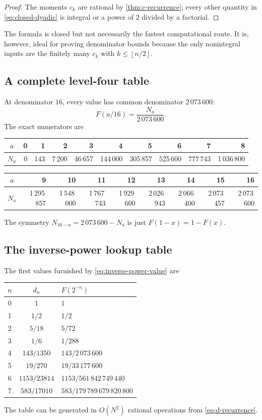 \documentclass[11pt,oneside]{article}
\theoremstyle{definition}
\theoremstyle{remark}
\newcommand{\floor}[1]{\left\lfloor#1\right\rfloor}
\begin{document}
\begin{proof}
The moments $c_k$ are rational by \cref{thm:c-recurrence}; every other quantity
in \eqref{eq:closed-dyadic} is integral or a power of $2$ divided by a factorial.
\end{proof}

The formula is closed but not necessarily the fastest computational route.  It is,
however, ideal for proving denominator bounds because the only nonintegral inputs
are the finitely many $c_k$ with $k\le\floor{n/2}$.

\subsection{A complete level-four table}

At denominator $16$, every value has common denominator $2\,073\,600$:
\begin{equation}\label{eq:level-four-common-den}
  F(a/16)=\frac{N_a}{2\,073\,600}.
\end{equation}
The exact numerators are
\begin{center}
\small
\begin{tabular}{c|rrrrrrrrr}
\toprule
$a$&0&1&2&3&4&5&6&7&8\\
\midrule
$N_a$&0&143&7\,200&46\,657&144\,000&305\,857&525\,600&777\,743&1\,036\,800\\
\bottomrule
\end{tabular}

\vspace{0.7em}
\begin{tabular}{c|rrrrrrrr}
\toprule
$a$&9&10&11&12&13&14&15&16\\
\midrule
$N_a$&1\,295\,857&1\,548\,000&1\,767\,743&1\,929\,600&2\,026\,943&2\,066\,400&2\,073\,457&2\,073\,600\\
\bottomrule
\end{tabular}
\end{center}
The symmetry $N_{16-a}=2\,073\,600-N_a$ is just
$F(1-x)=1-F(x)$.

\subsection{The inverse-power lookup table}

The first values furnished by \eqref{eq:inverse-power-value} are
\begin{center}
\begin{tabular}{ccl}
\toprule
$n$&$d_n$&$F(2^{-n})$\\
\midrule
0&$1$&$1$\\
1&$1/2$&$1/2$\\
2&$5/18$&$5/72$\\
3&$1/6$&$1/288$\\
4&$143/1350$&$143/2\,073\,600$\\
5&$19/270$&$19/33\,177\,600$\\
6&$1153/23814$&$1153/561\,842\,749\,440$\\
7&$583/17010$&$583/179\,789\,679\,820\,800$\\
\bottomrule
\end{tabular}
\end{center}
The table can be generated in $O(N^2)$ rational operations from
\eqref{eq:d-recurrence}.
\end{document}
